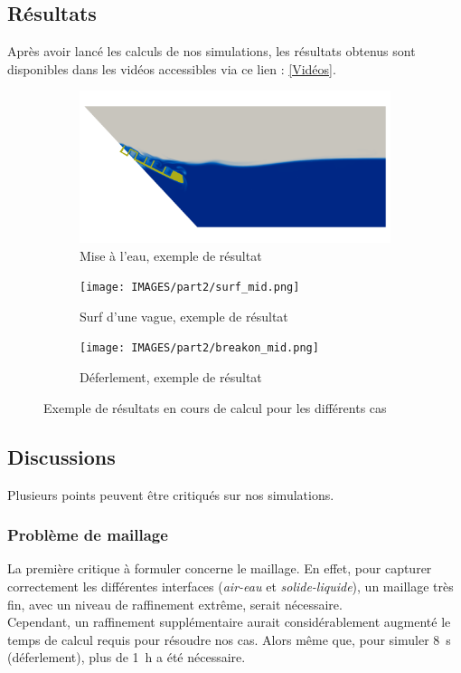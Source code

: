 \documentclass[../main.tex]{subfiles}
\begin{document}
\subsection{Résultats}
Après avoir lancé les calculs de nos simulations, les résultats obtenus sont disponibles dans les vidéos accessibles via ce lien : \href{https://github.com/YohStablo/CERF_ZEPHYR/tree/main/VIDEOS}{[Vidéos]}.

\begin{figure}[H]
\centering
\begin{subfigure}[b]{11cm}
    \centering
    \includegraphics[width=\linewidth]{IMAGES/part2/zephyr_launching.0072.png}
    \caption{Mise à l'eau, exemple de résultat}
\end{subfigure}
\vfill
\begin{subfigure}[b]{11cm}
    \centering
    \texttt{[image: IMAGES/part2/surf\_mid.png]}
    \caption{Surf d'une vague, exemple de résultat}
\end{subfigure}
\vfill
\begin{subfigure}[b]{11cm}
    \centering
    \texttt{[image: IMAGES/part2/breakon\_mid.png]}
    \caption{Déferlement, exemple de résultat}
\end{subfigure}
\caption{Exemple de résultats en cours de calcul pour les différents cas}
\end{figure}

\subsection{Discussions}
Plusieurs points peuvent être critiqués sur nos simulations.

\subsubsection*{Problème de maillage}
La première critique à formuler concerne le maillage. En effet, pour capturer correctement les différentes interfaces (\textit{air-eau} et \textit{solide-liquide}), un maillage très fin, avec un niveau de raffinement extrême, serait nécessaire.\\  
Cependant, un raffinement supplémentaire aurait considérablement augmenté le temps de calcul requis pour résoudre nos cas. Alors même que, pour simuler \qty{8}{\second} (déferlement), plus de \qty{1}{\hour} a été nécessaire.\\  
\end{document}
